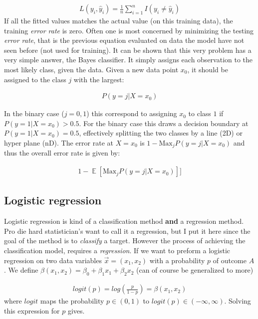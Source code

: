 \documentclass{article}
\DeclareMathOperator*{\E}{\mathbb{E}}
\begin{document}
\begin{align*}
    L(y_i, \hat{y}_i) = \frac{1}{n}\sum_{i=1}^{n} I(y_i \neq \hat{y}_i)
\end{align*}
If all the fitted values matches the actual value (on this training data), the training \textit{error rate} is zero. Often one is most concerned by minimizing the testing \textit{error rate}, that is the previous equation evaluated on data the model have not seen before (not used for training).
\newline
It can be shown that this very problem has a very simple answer, the Bayes classifier. It simply assigns each observation to the most likely class, given the data. Given a new data point $x_0$, it should be assigned to the class $j$ with the largest:

\begin{align*}
    P(y = j | X = x_0)
\end{align*}

In the binary case ($j = 0, 1$) this correspond to assigning $x_0$ to class $1$ if $P(y=1|X=x_0) > 0.5$. For the binary case this draws a decision boundary at $P(y=1|X=x_0) = 0.5$, effectively splitting the two classes by a line (2D) or hyper plane (nD). The error rate at $X=x_0$ is $1-\text{Max}_j P(y=j|X=x_0)$ and thus the overall error rate is given by:

\begin{align}
    1 - \E [ \text{Max}_j P(y=j|X=x_0)] ]
\end{align}

\subsection{Logistic regression}
Logistic regression is kind of a classification method \textbf{and} a regression method. Pro die hard statistician's want to call it a regression, but I put it here since the goal of the method is to \textit{classify} a target. However the process of achieving the classification model, requires a \textit{regression}. If we want to preform a logistic regression on two data variables $\Vec{x} = (x_1, x_2)$ with a probability $p$ of outcome $A$. We define $\beta(x_1, x_2) = \beta_0 + \beta_1 x_1 + \beta_2 x_2$ (can of course be generalized to more)

\begin{align*}
    logit(p) = log\left(\frac{p}{1-p}\right) = \beta(x_1, x_2)
\end{align*}
where $logit$ maps the probability $p \in (0,1)$ to $logit(p) \in (-\infty, \infty)$. Solving this expression for $p$ gives.
\end{document}
